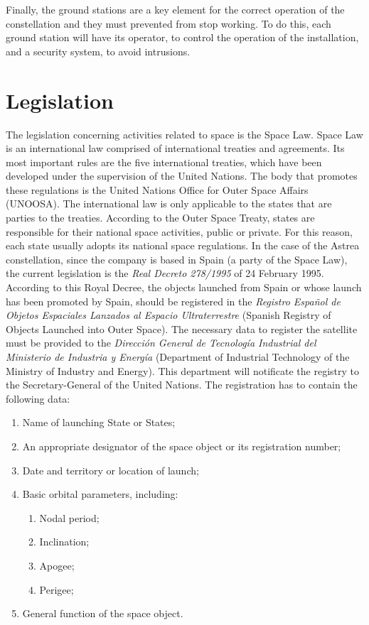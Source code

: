 Finally, the ground stations are a key element for the correct operation of the constellation and they must prevented from stop working. To do this, each ground station will have its operator, to control the operation of the installation, and a security system, to avoid intrusions.

\section{Legislation}
The legislation concerning activities related to space is the Space Law. Space Law is an international law comprised of international treaties and agreements. Its most important rules are the five international treaties, which have been developed under the supervision of the United Nations. The body that promotes these regulations is the United Nations Office for Outer Space Affairs (UNOOSA).
\newline
\newline
The international law is only applicable to the states that are parties to the treaties. According to the Outer Space Treaty, states are responsible for their national space activities, public or private. For this reason, each state usually adopts its national space regulations.
\newline
\newline
In the case of the Astrea constellation, since the company is based in Spain (a party of the Space Law), the current legislation is the \textit{Real Decreto 278/1995} of 24 February 1995. According to this Royal Decree, the objects launched from Spain or whose launch has been promoted by Spain, should be registered in the \textit{Registro Español de Objetos Espaciales Lanzados al Espacio Ultraterrestre} (Spanish Registry of Objects Launched into Outer Space). The necessary data to register the satellite must be provided to the \textit{Dirección General de Tecnología Industrial del Ministerio de Industria y Energía} (Department of Industrial Technology of the Ministry of Industry and Energy). This department will notificate the registry to the Secretary-General of the United Nations.
\newline
\newline
The registration has to contain the following data:
\begin{enumerate}[label=\alph*)]
\item Name of launching State or States;
\item An appropriate designator of the space object or its registration number;
\item Date and territory or location of launch;
\item Basic orbital parameters, including:
\begin{enumerate}[label=\Roman*)]
\item Nodal period;
\item Inclination;
\item Apogee;
\item Perigee;
\end{enumerate}
\item General function of the space object.
\end{enumerate}
